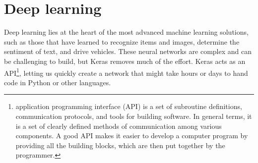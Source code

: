 \section{Deep learning}
\label{sec:deeplearning}
%
Deep learning lies at the heart of the most advanced machine learning solutions,
such as those that have learned to recognize items and images, determine the
sentiment of text, and drive vehicles. 
These neural networks are complex and can be challenging to build, but Keras 
removes much of the effort.
Keras acts as an API\footnote{application programming interface (API) is a set 
of subroutine definitions, communication protocols, and tools for building 
software. In general terms, it is a set of clearly defined methods of 
communication among various components. 
A good API makes it easier to develop a computer program by providing all the 
building blocks, which are then put together by the programmer.\cite{API}}, 
letting us quickly create a network that might take hours or days to hand code 
in Python or other languages.
%
